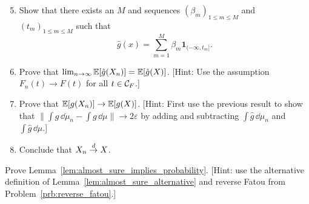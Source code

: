 \begin{problem}
\begin{enumerate}[label={(\alph*)}]
\setcounter{enumi}{4}
\item Show that there exists an $M$ and sequences $(\beta_m)_{1 \le m \le M}$ and $(t_m)_{1 \le m \le M}$ such that
\[
	\hat{g}(x) = \sum_{m = 1}^M \beta_m \mathbf{1}_{(-\infty, t_m]}.
\]
\item Prove that $\lim_{n \to \infty} \mathbb E[\hat{g}(X_n)] = \mathbb E[\hat{g}(X)]$. [Hint: Use the assumption $F_n(t) \to F(t)$ for all $t \in \mathcal C_F$.]
\item Prove that $\mathbb E[g(X_n)] \to \mathbb E[g(X)]$. [Hint: First use the previous result to show that $\| \int g \, \dd \mu_n - \int g \, \dd \mu\| \to 2\varepsilon$ by adding and subtracting $\int \hat{g} \, \dd \mu_n$ and $\int \hat{g} \, \dd \mu$.]
\item Conclude that $X_n \stackrel{d}{\rightarrow} X$.
\end{enumerate}
\end{problem}

\begin{problem}\label{prb:almost_sure_implies_probability}
Prove Lemma~\ref{lem:almost_sure_implies_probability}. [Hint: use the alternative definition of Lemma~\ref{lem:almost_sure_alternative} and reverse Fatou from Problem~\ref{prb:reverse_fatou}.]
\end{problem}